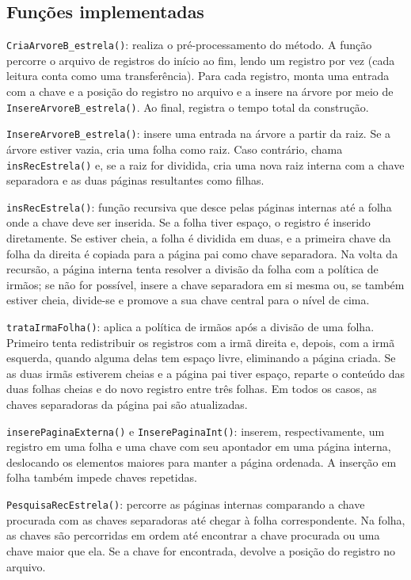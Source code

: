 \documentclass[12pt,a4paper]{article}
\begin{document}
\newpage

\subsection{Funções implementadas}

\texttt{CriaArvoreB\_estrela()}: realiza o pré-processamento do método. A função
percorre o arquivo de registros do início ao fim, lendo um registro por vez (cada
leitura conta como uma transferência). Para cada registro, monta uma entrada com a
chave e a posição do registro no arquivo e a insere na árvore por meio de
\texttt{InsereArvoreB\_estrela()}. Ao final, registra o tempo total da construção.

\texttt{InsereArvoreB\_estrela()}: insere uma entrada na árvore a partir da raiz. Se a
árvore estiver vazia, cria uma folha como raiz. Caso contrário, chama
\texttt{insRecEstrela()} e, se a raiz for dividida, cria uma nova raiz interna com a
chave separadora e as duas páginas resultantes como filhas.

\texttt{insRecEstrela()}: função recursiva que desce pelas páginas internas até a folha
onde a chave deve ser inserida. Se a folha tiver espaço, o registro é inserido
diretamente. Se estiver cheia, a folha é dividida em duas, e a primeira chave da folha
da direita é copiada para a página pai como chave separadora. Na volta da recursão, a
página interna tenta resolver a divisão da folha com a política de irmãos; se não for
possível, insere a chave separadora em si mesma ou, se também estiver cheia, divide-se
e promove a sua chave central para o nível de cima.

\texttt{trataIrmaFolha()}: aplica a política de irmãos após a divisão de uma folha.
Primeiro tenta redistribuir os registros com a irmã direita e, depois, com a irmã
esquerda, quando alguma delas tem espaço livre, eliminando a página criada. Se as duas
irmãs estiverem cheias e a página pai tiver espaço, reparte o conteúdo das duas folhas
cheias e do novo registro entre três folhas. Em todos os casos, as chaves separadoras
da página pai são atualizadas.

\texttt{inserePaginaExterna()} e \texttt{InserePaginaInt()}: inserem, respectivamente,
um registro em uma folha e uma chave com seu apontador em uma página interna,
deslocando os elementos maiores para manter a página ordenada. A inserção em folha
também impede chaves repetidas.

\texttt{PesquisaRecEstrela()}: percorre as páginas internas comparando a chave
procurada com as chaves separadoras até chegar à folha correspondente. Na folha, as
chaves são percorridas em ordem até encontrar a chave procurada ou uma chave maior que
ela. Se a chave for encontrada, devolve a posição do registro no arquivo.
\end{document}
